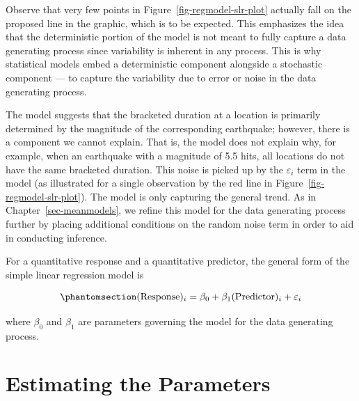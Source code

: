 \documentclass[
  letterpaper,
  DIV=11,
  numbers=noendperiod]{scrreprt}
\theoremstyle{definition}
\theoremstyle{definition}
\theoremstyle{plain}
\theoremstyle{remark}
\begin{document}
Observe that very few points in Figure~\ref{fig-regmodel-slr-plot}
actually fall on the proposed line in the graphic, which is to be
expected. This emphasizes the idea that the deterministic portion of the
model is not meant to fully capture a data generating process since
variability is inherent in any process. This is why statistical models
embed a deterministic component alongside a stochastic component --- to
capture the variability due to error or noise in the data generating
process.

The model suggests that the bracketed duration at a location is
primarily determined by the magnitude of the corresponding earthquake;
however, there is a component we cannot explain. That is, the model does
not explain why, for example, when an earthquake with a magnitude of 5.5
hits, all locations do not have the same bracketed duration. This noise
is picked up by the \(\varepsilon_i\) term in the model (as illustrated
for a single observation by the red line in
Figure~\ref{fig-regmodel-slr-plot}). The model is only capturing the
general trend. As in Chapter~\ref{sec-meanmodels}, we refine this model
for the data generating process further by placing additional conditions
on the random noise term in order to aid in conducting inference.

\begin{tcolorbox}[enhanced jigsaw, colbacktitle=quarto-callout-important-color!10!white, colback=white, left=2mm, title=\textcolor{quarto-callout-important-color}{\faExclamation}\hspace{0.5em}{Simple Linear Regression Model}, toptitle=1mm, leftrule=.75mm, breakable, bottomrule=.15mm, arc=.35mm, rightrule=.15mm, toprule=.15mm, coltitle=black, opacityback=0, colframe=quarto-callout-important-color-frame, opacitybacktitle=0.6, bottomtitle=1mm, titlerule=0mm]

For a quantitative response and a quantitative predictor, the general
form of the simple linear regression model is

\begin{equation}\phantomsection\label{eq-slr}{(\text{Response})_i = \beta_0 + \beta_1 (\text{Predictor})_i + \varepsilon_i}\end{equation}

where \(\beta_0\) and \(\beta_1\) are parameters governing the model for
the data generating process.

\end{tcolorbox}

\section{Estimating the Parameters}\label{estimating-the-parameters}
\end{document}
